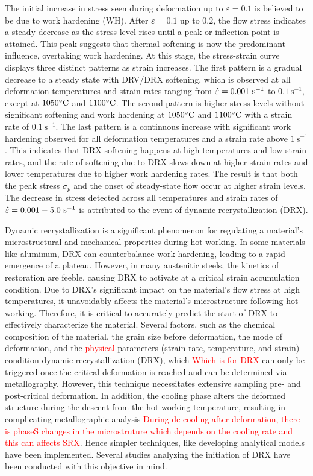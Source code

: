 \documentclass[metals,article,submit,pdftex,moreauthors]{Definitions/mdpi}
\DeclareRobustCommand{\mdot}[1]{\accentset{\mbox{\bfseries .}}{#1}}
\DeclareRobustCommand{\ps}{\text{s}^{-1}}
\begin{document}
The initial increase in stress seen during deformation up to $\varepsilon=0.1$ is believed to be due to work hardening (WH).
After $\varepsilon=0.1$ up to $0.2$, the flow stress indicates a steady decrease as the stress level rises until a peak or inflection point is attained.
This peak suggests that thermal softening is now the predominant influence, overtaking work hardening.
At this stage, the stress-strain curve displays three distinct patterns as strain increases.
The first pattern is a gradual decrease to a steady state with DRV/DRX softening, which is observed at all deformation temperatures and strain rates ranging from $\mdot\varepsilon=0.001~\ps$ to $0.1~\ps$, except at $1050\celsius$ and $1100\celsius$.
The second pattern is higher stress levels without significant softening and work hardening at $1050\celsius$ and $1100\celsius$ with a strain rate of $0.1~\ps$.
The last pattern is a continuous increase with significant work hardening observed for all deformation temperatures and a strain rate above $1~\ps$.
This indicates that DRX softening happens at high temperatures and low strain rates,
and the rate of softening due to DRX slows down at higher strain rates and lower temperatures due to higher work hardening rates.
The result is that both the peak stress $\sigma_p$ and the onset of steady-state flow occur at higher strain levels.
The decrease in stress detected across all temperatures and strain rates of $\mdot\varepsilon=0.001-5.0~\ps$ is attributed to the event of dynamic recrystallization (DRX).

Dynamic recrystallization is a significant phenomenon for regulating a material's microstructural and mechanical properties during hot working.
In some materials like aluminum, DRX can counterbalance work hardening, leading to a rapid emergence of a plateau.
However, in many austenitic steels, the kinetics of restoration are feeble, causing DRX to activate at a critical strain accumulation condition.
Due to DRX's significant impact on the material's flow stress at high temperatures, it unavoidably affects the material's microstructure following hot working.
Therefore, it is critical to accurately predict the start of DRX to effectively characterize the material.
Several factors, such as the chemical composition of the material, the grain size before deformation, the mode of deformation, and the \textcolor{red}{physical} parameters (strain rate, temperature, and strain) condition dynamic recrystallization (DRX), which \textcolor{red}{Which is for DRX} can only be triggered once the critical deformation is reached and can be determined via metallography.
However, this technique necessitates extensive sampling pre- and post-critical deformation.
In addition, the cooling phase alters the deformed structure during the descent from the hot working temperature, resulting in complicating metallographic analysis \textcolor{red}{During de cooling after deformation, there is phaseS changes in the microstruture which depends on the cooling rate and this can affects SRX}.
Hence simpler techniques, like developing analytical models have been implemented.
Several studies analyzing the initiation of DRX have been conducted with this objective in mind.
\end{document}
